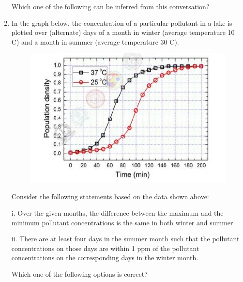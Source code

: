 \documentclass[journal]{IEEEtran}
\begin{document}
\begin{enumerate}[leftmargin=0pt]
    Which one of the following can be inferred from this conversation?
    \hfill{}
    \begin{enumerate}
    \end{enumerate}


    \item In the graph below, the concentration of a particular pollutant in a lake is plotted over (alternate) days of a month in winter (average temperature 10 \degree C) and a month in summer (average temperature 30 \degree C).
    

     \begin{figure}[h]
    \centering
    \includegraphics[width=0.5\columnwidth]{Figs/image (33).png}
    \caption*{}
    \label{fig:65}
    \end{figure}

    Consider the following statements based on the data shown above:

    i. Over the given months, the difference between the maximum and the minimum pollutant concentrations is the same in both winter and summer.

    ii. There are at least four days in the summer month such that the pollutant concentrations on those days are within 1 ppm of the pollutant concentrations on the corresponding days in the winter month.

    Which one of the following options is correct?
    \hfill{}
    \begin{enumerate}
    \end{enumerate}
\end{enumerate}
\end{document}
